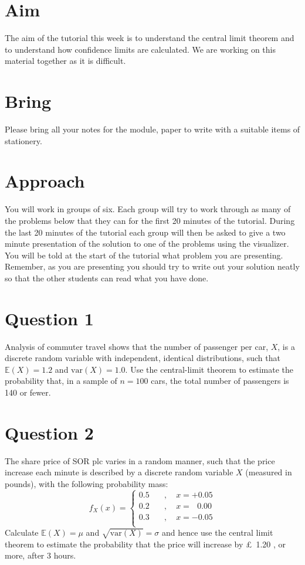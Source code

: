 \documentclass[a4paper]{article}
\begin{document}
\section{Aim}

The aim of the tutorial this week is to understand the central limit theorem and to understand how confidence limits are calculated.  We are working on this material together as it is difficult.

\section{Bring}

Please bring all your notes for the module, paper to write with a suitable items of stationery.

\section{Approach}

You will work in groups of six.  Each group will try to work through as many of the problems below that they can for the first 20 minutes of the tutorial.  During the last 20 minutes of the tutorial 
each group will then be asked to give a two minute presentation of the solution to one of the problems using the visualizer.  You will be told at the start of the tutorial what problem you are 
presenting.  Remember, as you are presenting you should try to write out your solution neatly so that the other students can read what you have done.

\section{Question 1}

Analysis of commuter travel  shows that the number of passenger per car, $X$,
is a discrete random variable with independent, identical distributions, such that
$\mathbb{E}(X)=1.2$ and $\textrm{var}(X) = 1.0$.  Use the central-limit theorem  to estimate
the probability that, in a sample of $n=100$ cars, the total number of passengers is 140 or fewer.


\section{Question 2}

The share price of SOR plc  varies in  a random manner, such that
the price increase each minute is described by a discrete
random variable  $X$ (measured in pounds), with the following probability mass:
$$
f_{X}(x) =
\left\{
\begin{array}{ll}
0.5   & \quad , \quad  x=+0.05  \\
0.2  & \quad , \quad x=\ \ \ 0.00  \\
0.3   & \quad , \quad  x=-0.05  \\
\end{array}
\right.
$$
Calculate $\mathbb{E}(X)=\mu$ and $\sqrt{\textrm{var}(X)}=\sigma$ and hence use the central limit
theorem to estimate the probability  that the price will increase by \pounds~1.20 , or more,  after 3  hours.
\end{document}
